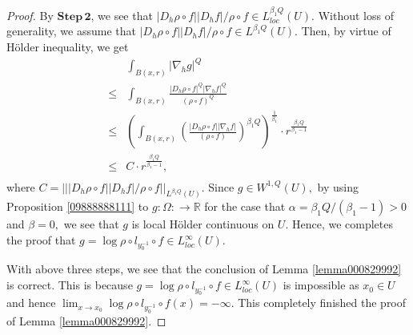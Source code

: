 \documentclass[11pt,twoside]{article}
\theoremstyle{definition}
\theoremstyle{remark}
\begin{document}
\begin{proof}
By $\mathbf{Step\,2}$, we see that $\vert D_{h}\rho\circ f\vert\vert D_{h}f\vert/\rho\circ f\in L_{loc}^{\beta_{1} Q}(U).$ Without loss of generality, we assume that $\vert D_{h}\rho\circ f\vert\vert D_{h}f\vert/\rho\circ f\in L^{\beta_{1} Q}(U).$ Then, by virtue of  H\"{o}lder inequality, we get
\begin{equation}
\begin{aligned}
&\int_{B(x,r)}\vert \nabla_{h}g\vert^{Q}\\
\leq&\int_{B(x,r)}\frac{\vert D_{h}\rho\circ f\vert^{Q}\vert \nabla_{h}f\vert^{Q}}{(\rho\circ f)^{Q}}\\
\leq& 
\left(\int_{B(x,r)}\left(\frac{\vert D_{h}\rho\circ f\vert\vert \nabla_{h}f\vert}{(\rho\circ f)}\right)^{\beta_{1} Q}\right)^{\frac{1}{\beta_{1}}} \cdot r^{\frac{\beta_{1} Q}{\beta_{1}-1}}\\
\leq& C \cdot r^{\frac{\beta_{1} Q}{\beta_{1}-1}},\\
\end{aligned}
\end{equation}
where $C=\vert\vert\vert D_{h}\rho\circ f\vert\vert D_{h}f\vert/\rho\circ f\vert\vert_{L^{\beta_{1} Q}(U)}.$
Since $g\in W^{1,Q}(U),$ by using  Proposition \ref{09888888111} to $g:\Omega:\rightarrow \mathbb{R}$ for the case that $\alpha=\beta_{1}Q/(\beta_{1}-1)>0$ and $\beta=0,$ we see that $g$ is local H\"{o}lder continuous on $U$. Hence, we completes the proof that $g=\log\rho\circ l_{y_{0}^{-1}}\circ f\in L_{loc}^{\infty}(U).$ 

With above three steps, we see that the conclusion of Lemma \ref{lemma000829992} is correct. This is because  $g=\log\rho\circ l_{y_{0}^{-1}}\circ f\in L_{loc}^{\infty}(U)$ is impossible as $x_{0}\in U$ and hence $\lim_{x\rightarrow x_{0}}\log\rho\circ l_{y_{0}^{-1}}\circ f(x)=-\infty.$ This completely finished the proof of Lemma \ref{lemma000829992}.
\end{proof}
\end{document}
